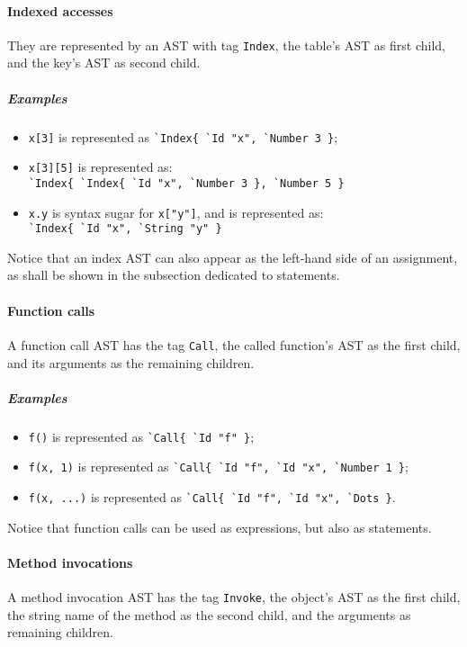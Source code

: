 \paragraph{Indexed accesses}
They are represented by an AST with tag \verb+Index+, the table's AST
as first child, and the key's AST as second child.

\subparagraph{Examples}
\begin{itemize}
\item \verb+x[3]+ is represented as \verb+`Index{ `Id "x", `Number 3 }+;
\item \verb+x[3][5]+ is represented as:\\
  \verb+`Index{ `Index{ `Id "x", `Number 3 }, `Number 5 }+
\item \verb+x.y+ is syntax sugar for \verb+x["y"]+, and is represented as:\\
  \verb+`Index{ `Id "x", `String "y" }+
\end{itemize}

Notice that an index AST can also appear as the left-hand side of
an assignment, as shall be shown in the subsection dedicated to
statements.

\paragraph{Function calls}
A function call AST has the tag \verb+Call+, the called function's AST
as the first child, and its arguments as the remaining children.

\subparagraph{Examples}
\begin{itemize}
\item \verb+f()+ is represented as \verb+`Call{ `Id "f" }+;
\item \verb+f(x, 1)+ is represented as
  \verb+`Call{ `Id "f", `Id "x", `Number 1 }+;
\item \verb+f(x, ...)+ is represented as
  \verb+`Call{ `Id "f", `Id "x", `Dots }+.
\end{itemize}

Notice that function calls can be used as expressions, but also as statements.

\paragraph{Method invocations}
A method invocation AST has the tag \verb+Invoke+, the object's AST as
the first child, the string name of the method as the second child, and
the arguments as remaining children.

